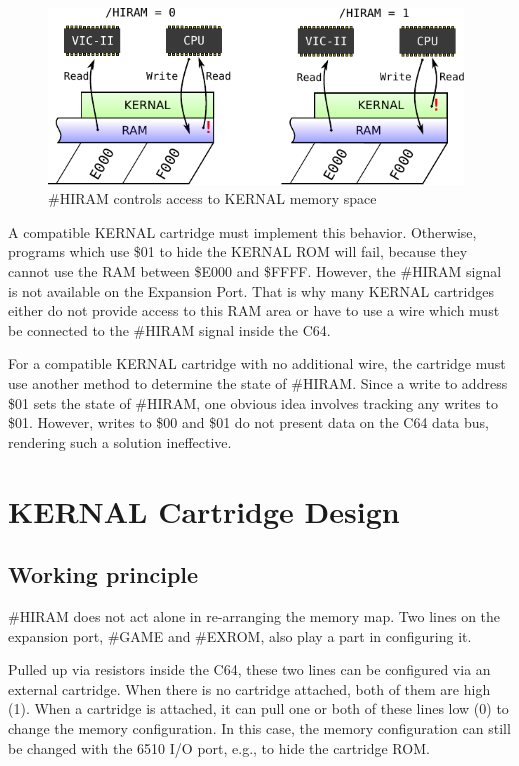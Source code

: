 \documentclass[a4paper,oneside]{memoir}
\begin{document}
\begin{figure}
    \centering
    \includegraphics[width=11cm]{src/memory-map-hiram}
    \caption{\#HIRAM controls access to KERNAL memory space}
    \label{fig:memory-map-hiram}
\end{figure}

A compatible KERNAL cartridge must implement this behavior.
Otherwise, programs which use \$01 to hide the KERNAL ROM will fail,
because they cannot use the RAM between \$E000 and \$FFFF. However,
the \#HIRAM signal is not available on the Expansion Port. That is why
many KERNAL cartridges either do not provide access to this RAM area
or have to use a wire which must be connected to the \#HIRAM signal
inside the C64.

For a compatible KERNAL cartridge with no additional wire, the
cartridge must use another method to determine the state of \#HIRAM.
Since a write to address \$01 sets the state of \#HIRAM, one obvious
idea involves tracking any writes to \$01. However, writes to \$00
and \$01 do not present data on the C64 data bus, rendering such a
solution ineffective.

\chapter{KERNAL Cartridge Design}

\section{Working principle}

\#HIRAM does not act alone in re-arranging the memory map. Two lines
on the expansion port, \#GAME and \#EXROM, also play a part in
configuring it.

Pulled up via resistors inside the C64, these two lines can be configured via an external cartridge.
When there is no cartridge attached, both of them are high (1).
When a cartridge is attached, it can pull one or both of these lines low (0) to change the memory configuration. 
In this case, the memory configuration can still be changed with the 6510 I/O port, e.g.,
to hide the cartridge ROM.
\end{document}
